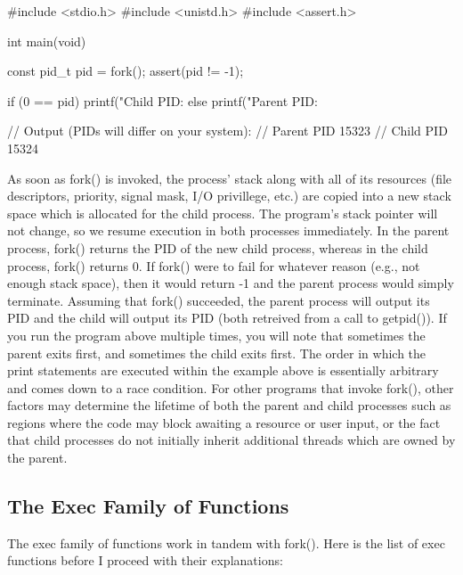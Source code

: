 \documentclass{article}
\begin{document}
\begin{clst}

#include <stdio.h>
#include <unistd.h>
#include <assert.h>

int main(void) {
    const pid_t pid = fork();
    assert(pid != -1);

    if (0 == pid) {
        printf("Child PID: %
    } else {
        printf("Parent PID: %
    }
}

// Output (PIDs will differ on your system):
// Parent PID 15323
// Child PID 15324

\end{clst}

As soon as fork() is invoked, the process' stack along with all of its resources (file descriptors, priority,
signal mask, I/O privillege, etc.) are copied into a new stack space which is allocated for the child process.
The program's stack pointer will not change, so we resume execution in both processes immediately. In the
parent process, fork() returns the PID of the new child process, whereas in the child process, fork() returns
0. If fork() were to fail for whatever reason (e.g., not enough stack space), then it would return -1 and the
parent process would simply terminate. Assuming that fork() succeeded, the parent process will output its PID
and the child will output its PID (both retreived from a call to getpid()). If you run the program above
multiple times, you will note that sometimes the parent exits first, and sometimes the child exits first. The
order in which the print statements are executed within the example above is essentially arbitrary and comes
down to a race condition. For other programs that invoke fork(), other factors may determine the lifetime
of both the parent and child processes such as regions where the code may block awaiting a resource or user
input, or the fact that child processes do not initially inherit additional threads which are owned by the
parent.

\subsection{The Exec Family of Functions}

The exec family of functions work in tandem with fork(). Here is the list of exec functions before I proceed
with their explanations:
\end{document}
